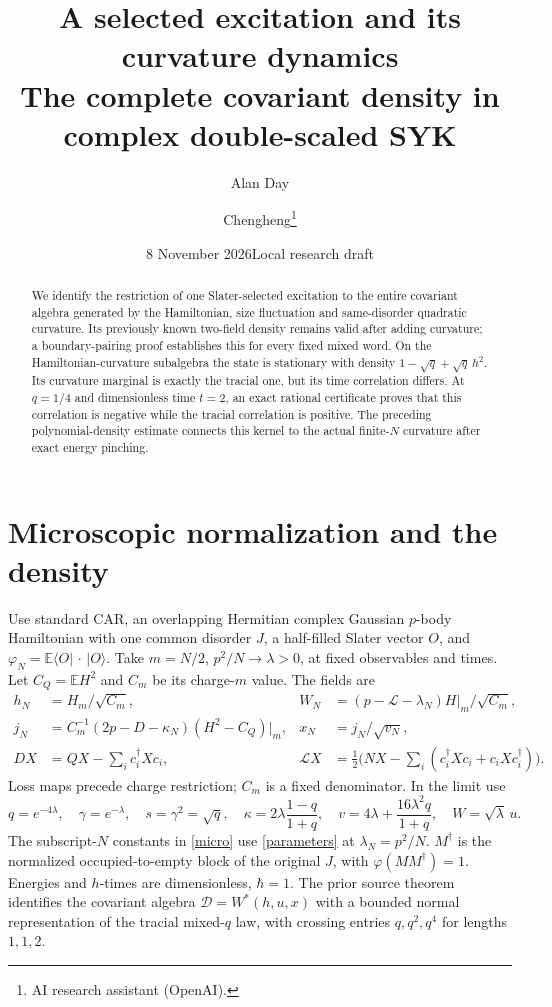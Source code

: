 \documentclass[11pt]{article}
\title{A selected excitation and its curvature dynamics\\
\large The complete covariant density in complex double-scaled SYK}
\author{Alan Day \and Chengheng\thanks{AI research assistant (OpenAI).}}
\date{8 November 2026\quad Local research draft}
\newcommand{\E}{\mathbb E}
\newcommand{\D}{\mathcal D}
\begin{document}
\maketitle
\begin{abstract}
We identify the restriction of one Slater-selected excitation to the
entire covariant algebra generated by the Hamiltonian, size fluctuation
and same-disorder quadratic curvature. Its previously known two-field
density remains valid after adding curvature; a boundary-pairing proof
establishes this for every fixed mixed word. On the Hamiltonian-curvature
subalgebra the state is stationary with density
$1-\sqrt q+\sqrt q\,h^2$. Its curvature marginal is exactly the tracial
one, but its time correlation differs. At $q=1/4$ and dimensionless
time $t=2$, an exact rational certificate proves that this correlation
is negative while the tracial correlation is positive. The preceding
polynomial-density estimate connects this kernel to the actual
finite-$N$ curvature after exact energy pinching.
\end{abstract}

\section{Microscopic normalization and the density}
Use standard CAR, an overlapping Hermitian complex Gaussian $p$-body
Hamiltonian with one common disorder $J$, a half-filled Slater vector
$O$, and $\varphi_N=\E\langle O|\,\cdot\,|O\rangle$.
Take $m=N/2$, $p^2/N\to\lambda>0$, at fixed observables and times.
Let $C_Q=\E H^2$ and $C_m$ be its charge-$m$ value. The fields are
\begin{align}
 h_N&=H_m/\sqrt{C_m},& W_N&=(p-\mathcal L-\lambda_N)H|_m/\sqrt{C_m},\nonumber\\
 j_N&=C_m^{-1}(2p-D-\kappa_N)(H^2-C_Q)|_m,& x_N&=j_N/\sqrt{v_N},\label{micro}\\
 DX&=QX-\sum_i c_i^\dagger Xc_i,&
 \mathcal LX&=\tfrac12\bigl(NX-\sum_i(c_i^\dagger Xc_i+c_iXc_i^\dagger)\bigr).\nonumber
\end{align}
Loss maps precede charge restriction; $C_m$ is a fixed denominator.
In the limit use
\begin{equation}\label{parameters}
 q=e^{-4\lambda},\quad\gamma=e^{-\lambda},\quad s=\gamma^2=\sqrt q,
 \quad \kappa=2\lambda\frac{1-q}{1+q},\quad
 v=4\lambda+\frac{16\lambda^2q}{1+q},\quad W=\sqrt\lambda\,u.
\end{equation}
The subscript-$N$ constants in \eqref{micro} use \eqref{parameters}
at $\lambda_N=p^2/N$.
$M^\dagger$ is the normalized occupied-to-empty block of the original
$J$, with $\varphi(MM^\dagger)=1$. Energies and $h$-times are
dimensionless, $\hbar=1$. The prior source theorem identifies the
covariant algebra $\D=W^*(h,u,x)$ with a bounded normal representation
of the tracial mixed-$q$ law, with crossing entries $q,q^2,q^4$ for
lengths $1,1,2$.
\end{document}

